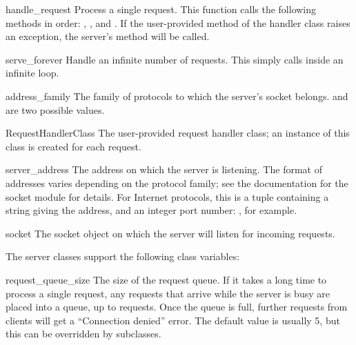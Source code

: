 \begin{funcdesc}{handle_request}{}
Process a single request.  This function calls the following methods
in order: , , and
.  If the user-provided 
method of the handler class raises an exception, the server's
 method will be called.
\end{funcdesc}

\begin{funcdesc}{serve_forever}{}
Handle an infinite number of requests.  This simply calls
 inside an infinite loop.
\end{funcdesc}

\begin{datadesc}{address_family}
The family of protocols to which the server's socket belongs.
 and  are two
possible values.
\end{datadesc}

\begin{datadesc}{RequestHandlerClass}
The user-provided request handler class; an instance of this class is
created for each request.
\end{datadesc}

\begin{datadesc}{server_address}
The address on which the server is listening.  The format of addresses
varies depending on the protocol family; see the documentation for the
socket module for details.  For Internet protocols, this is a tuple
containing a string giving the address, and an integer port number:
, for example.
\end{datadesc}

\begin{datadesc}{socket}
The socket object on which the server will listen for incoming requests.
\end{datadesc}


The server classes support the following class variables:

\begin{datadesc}{request_queue_size}
The size of the request queue.  If it takes a long time to process a
single request, any requests that arrive while the server is busy are
placed into a queue, up to  requests.  Once
the queue is full, further requests from clients will get a
``Connection denied'' error.  The default value is usually 5, but this
can be overridden by subclasses.
\end{datadesc}

